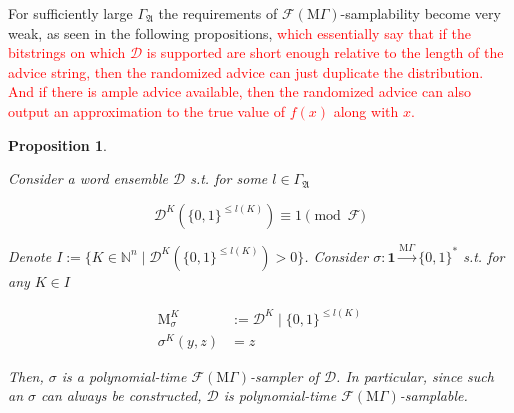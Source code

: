 \documentclass[11pt]{article}
\numberwithin{equation}{section}
\theoremstyle{definition}
\theoremstyle{plain}
\newtheorem{proposition}{Proposition}[section]
\newcommand{\Bool}{\{0,1\}}
\newcommand{\Words}{{\Bool^*}}
\DeclareMathOperator{\M}{M}
\newcommand{\Nats}{\mathbb{N}}
\newcommand{\Dist}{\mathcal{D}}
\newcommand{\GrowA}{\Gamma_{\mathfrak{A}}}
\newcommand{\MGrow}{\mathrm{M}\Gamma}
\newcommand{\Fall}{\mathcal{F}}
\newcommand{\EMG}{\Fall(\MGrow)}
\newcommand{\MScheme}{\xrightarrow{\MGrow}}
\begin{document}
For sufficiently large $\GrowA$ the requirements of $\EMG$-samplability become very weak, as seen in the following propositions, \textcolor{red}{which essentially say that if the bitstrings on which $\Dist$ is supported are short enough relative to the length of the advice string, then the randomized advice can just duplicate the distribution. And if there is ample advice available, then the randomized advice can also output an approximation to the true value of $f(x)$ along with $x$.}
\begin{samepage}
\begin{proposition}
\label{prp:adv_mgamma_smp}

Consider a word ensemble $\Dist$ s.t. for some $l \in \GrowA$

\begin{equation}
\label{eqn:prp__adv_mgamma_smp}
\Dist^{K}(\Bool^{\leq l(K)}) \equiv 1 \pmod \Fall
\end{equation}

Denote ${I:=\{K \in \Nats^n \mid \Dist^{K}(\Bool^{\leq l(K)}) > 0\}}$. Consider ${\sigma: \bm{1} \MScheme \Words}$ s.t. for any ${K \in I}$

\begin{align*}
\M_\sigma^K&:=\Dist^{K} \mid \Bool^{\leq l(K)} \\
\sigma^K(y,z)&=z
\end{align*}

Then, $\sigma$ is a polynomial-time $\EMG$-sampler of $\Dist$. In particular, since such an $\sigma$ can always be constructed, $\Dist$ is polynomial-time $\EMG$-samplable.

\end{proposition}
\end{samepage}
\end{document}
